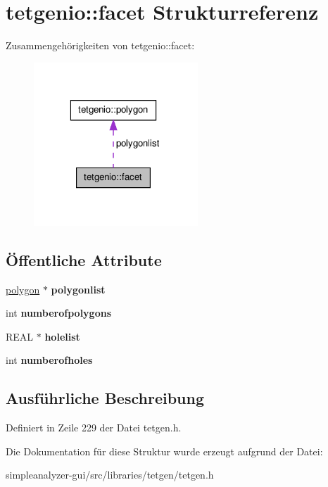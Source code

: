 \hypertarget{structtetgenio_1_1facet}{\section{tetgenio\-:\-:facet Strukturreferenz}
\label{structtetgenio_1_1facet}
}


Zusammengehörigkeiten von tetgenio\-:\-:facet\-:\nopagebreak
\begin{figure}[H]
\begin{center}
\leavevmode
\includegraphics[width=175pt]{structtetgenio_1_1facet__coll__graph}
\end{center}
\end{figure}
\subsection*{Öffentliche Attribute}
\begin{DoxyCompactItemize}
\item 
\hypertarget{structtetgenio_1_1facet_ad73474fc4f07efdd714f0441948c5dfa}{\hyperlink{structtetgenio_1_1polygon}{polygon} $\ast$ {\bfseries polygonlist}}\label{structtetgenio_1_1facet_ad73474fc4f07efdd714f0441948c5dfa}

\item 
\hypertarget{structtetgenio_1_1facet_a845d93a1341532b2f0de8b1e75a5d0bb}{int {\bfseries numberofpolygons}}\label{structtetgenio_1_1facet_a845d93a1341532b2f0de8b1e75a5d0bb}

\item 
\hypertarget{structtetgenio_1_1facet_aecc34fbcd7087b45baecf2ba43d57757}{R\-E\-A\-L $\ast$ {\bfseries holelist}}\label{structtetgenio_1_1facet_aecc34fbcd7087b45baecf2ba43d57757}

\item 
\hypertarget{structtetgenio_1_1facet_acc9857df4007aa20199f8979353339c7}{int {\bfseries numberofholes}}\label{structtetgenio_1_1facet_acc9857df4007aa20199f8979353339c7}

\end{DoxyCompactItemize}


\subsection{Ausführliche Beschreibung}


Definiert in Zeile 229 der Datei tetgen.\-h.



Die Dokumentation für diese Struktur wurde erzeugt aufgrund der Datei\-:\begin{DoxyCompactItemize}
\item 
simpleanalyzer-\/gui/src/libraries/tetgen/tetgen.\-h\end{DoxyCompactItemize}
